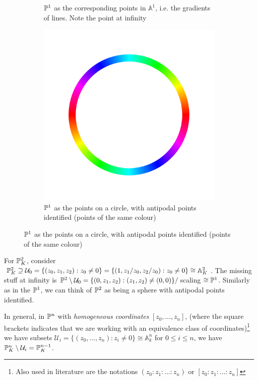 \documentclass[10pt,a4paper,rgb]{article}
\newcommand{\A}{\mathbb{A}}
\begin{document}
\begin{figure}[H]
\begin{subfigure}{.4\textwidth}
\caption{$\P^1$ as the corresponding points in $\A^1$, i.e. the gradients of lines. Note the point at infinity}
\end{subfigure}\hfill
\begin{subfigure}{.4\textwidth}
\includegraphics[scale=.1]{circle.png}
\caption{$\P^1$ as the points on a circle, with antipodal points identified (points of the same colour)}
\end{subfigure}
\end{figure}

For $\P^2_K$, consider $\P^2_K \supseteq \mathcal{U}_0 = \{(z_0,z_1,z_2):z_0 \neq 0\} = \{(1,z_1/z_0,z_2/z_0):z_0\neq 0\} \cong \mathbb{A}_K^2$. The missing stuff at infinity is $\P^2 \setminus \mathcal{U}_0 = \{(0,z_1, z_2): (z_1,z_2) \neq (0,0)\}/$scaling $ \cong \P^1$. Similarly as in the $\P^1$, we can think of $\P^2$ as being a sphere with antipodal points identified.

In general, in $\P^n$ with \emph{homogeneous coordinates} $[z_0, \ldots, z_n]$, (where the square brackets indicates that we are working with an equivalence class of coordinates)\footnote{Also used in literature are the notations $(z_0:z_1:\ldots:z_n)$ or $[z_0:z_1:\ldots:z_n]$} we have subsets $\mathcal{U}_i = \{(z_0, \ldots, z_n):z_i \neq 0\}\cong \mathbb{A}_k^n$ for $0\leq i\leq n$, we have $\P_K^n \setminus \mathcal{U}_i = \P_K^{n-1}$.
\end{document}
